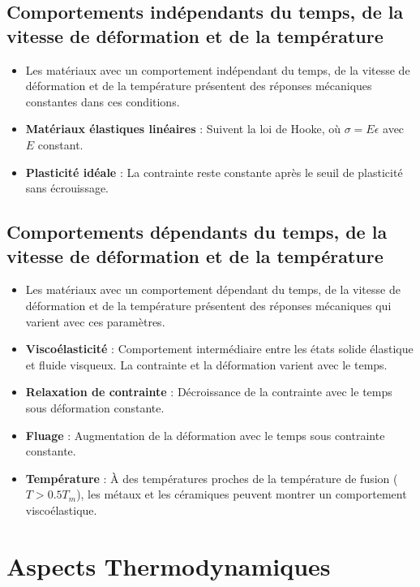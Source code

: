 \documentclass{article}
\begin{document}
    \subsection{Comportements indépendants du temps, de la vitesse de déformation et de la température}
    
    \begin{itemize}
        \item Les matériaux avec un comportement indépendant du temps, de la vitesse de déformation et de la température présentent des réponses mécaniques constantes dans ces conditions.
        \item \textbf{Matériaux élastiques linéaires} : Suivent la loi de Hooke, où $\sigma = E \epsilon$ avec $E$ constant.
        \item \textbf{Plasticité idéale} : La contrainte reste constante après le seuil de plasticité sans écrouissage.
    \end{itemize}
    
    \subsection{Comportements dépendants du temps, de la vitesse de déformation et de la température}
    
    \begin{itemize}
        \item Les matériaux avec un comportement dépendant du temps, de la vitesse de déformation et de la température présentent des réponses mécaniques qui varient avec ces paramètres.
        \item \textbf{Viscoélasticité} : Comportement intermédiaire entre les états solide élastique et fluide visqueux. La contrainte et la déformation varient avec le temps.
        \item \textbf{Relaxation de contrainte} : Décroissance de la contrainte avec le temps sous déformation constante.
        \item \textbf{Fluage} : Augmentation de la déformation avec le temps sous contrainte constante.
        \item \textbf{Température} : À des températures proches de la température de fusion ($T > 0.5 T_m$), les métaux et les céramiques peuvent montrer un comportement viscoélastique.
    \end{itemize}

\section{Aspects Thermodynamiques}
\end{document}
